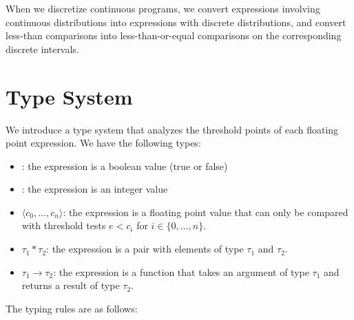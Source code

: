 \documentclass[acmsmall,screen,dvipsnames,x11names,nonacm,anonymous,review]{acmart}
\newcommand{\bool}{\text{\ttfamily\bfseries bool}}
\newcommand{\intty}{\text{\ttfamily\bfseries int}}
\newcommand{\float}{\text{\ttfamily\bfseries float}}
\begin{document}
When we discretize continuous programs, we convert expressions involving continuous distributions into expressions with discrete distributions, and convert less-than comparisons into less-than-or-equal comparisons on the corresponding discrete intervals.

\section{Type System}

We introduce a type system that analyzes the threshold points of each floating point expression. We have the following types:
\begin{itemize}
    \item \bool: the expression is a boolean value (true or false)
    \item \intty: the expression is an integer value
    \item \float$\langle c_0, \ldots, c_n \rangle$: the expression is a floating point value that can only be compared with threshold tests $e < c_i$ for $i \in \{0, \ldots, n\}$.
    \item $\tau_1 * \tau_2$: the expression is a pair with elements of type $\tau_1$ and $\tau_2$.
    \item $\tau_1 \rightarrow \tau_2$: the expression is a function that takes an argument of type $\tau_1$ and returns a result of type $\tau_2$.
\end{itemize}

The typing rules are as follows:
\end{document}
